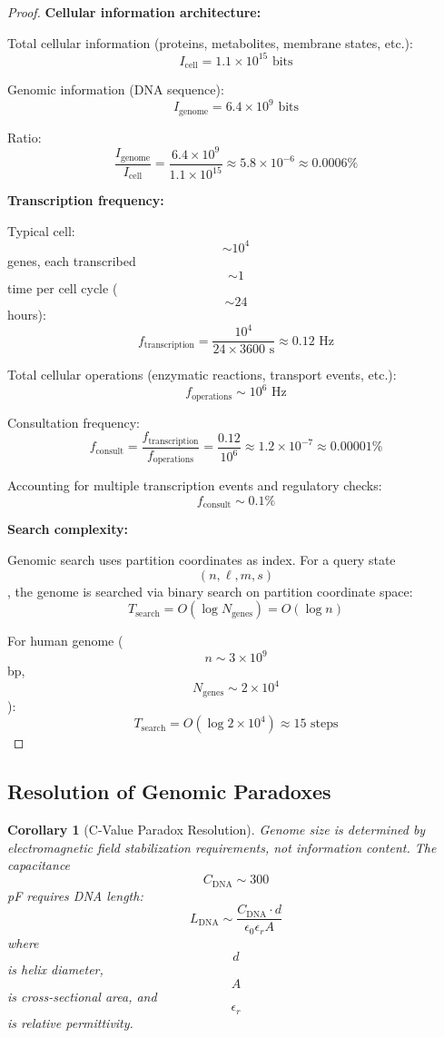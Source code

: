 \documentclass[12pt,a4paper]{article}
\newtheorem{corollary}[theorem]{Corollary}
\begin{document}
\begin{proof}
\textbf{Cellular information architecture:}

Total cellular information (proteins, metabolites, membrane states, etc.):
$$
I_{\text{cell}} = 1.1 \times 10^{15} \text{ bits}
$$

Genomic information (DNA sequence):
$$
I_{\text{genome}} = 6.4 \times 10^9 \text{ bits}
$$

Ratio:
$$
\frac{I_{\text{genome}}}{I_{\text{cell}}} = \frac{6.4 \times 10^9}{1.1 \times 10^{15}} \approx 5.8 \times 10^{-6} \approx 0.0006\%
$$

\textbf{Transcription frequency:}

Typical cell: $$\sim 10^4$$ genes, each transcribed $$\sim 1$$ time per cell cycle ($$\sim 24$$ hours):
$$
f_{\text{transcription}} = \frac{10^4}{24 \times 3600 \text{ s}} \approx 0.12 \text{ Hz}
$$

Total cellular operations (enzymatic reactions, transport events, etc.):
$$
f_{\text{operations}} \sim 10^6 \text{ Hz}
$$

Consultation frequency:
$$
f_{\text{consult}} = \frac{f_{\text{transcription}}}{f_{\text{operations}}} = \frac{0.12}{10^6} \approx 1.2 \times 10^{-7} \approx 0.00001\%
$$

Accounting for multiple transcription events and regulatory checks:
$$
f_{\text{consult}} \sim 0.1\%
$$

\textbf{Search complexity:}

Genomic search uses partition coordinates as index. For a query state $$(n, \ell, m, s)$$, the genome is searched via binary search on partition coordinate space:
$$
T_{\text{search}} = O(\log N_{\text{genes}}) = O(\log n)
$$

For human genome ($$n \sim 3 \times 10^9$$ bp, $$N_{\text{genes}} \sim 2 \times 10^4$$):
$$
T_{\text{search}} = O(\log 2 \times 10^4) \approx 15 \text{ steps}
$$
\end{proof}

\subsection{Resolution of Genomic Paradoxes}

\begin{corollary}[C-Value Paradox Resolution]
Genome size is determined by electromagnetic field stabilization requirements, not information content. The capacitance $$C_{\text{DNA}} \sim 300$$ pF requires DNA length:
$$
L_{\text{DNA}} \sim \frac{C_{\text{DNA}} \cdot d}{\epsilon_0 \epsilon_r A}
$$
where $$d$$ is helix diameter, $$A$$ is cross-sectional area, and $$\epsilon_r$$ is relative permittivity.
\end{corollary}
\end{document}
